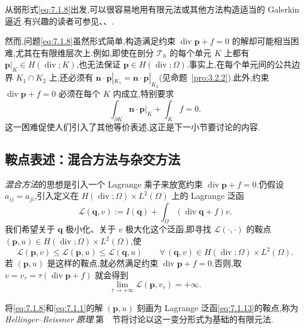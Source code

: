 从弱形式\eqref{eq:7.1.8}出发,可以很容易地用有限元法或其他方法构造适当的 Galerkin 逼近.有兴趣的读者可参见、、.

然而,问题\eqref{eq:7.1.8}虽然形式简单,构造满足约束 \(\operatorname{div}\boldsymbol{p}+f=0\) 的解却可能相当困难,尤其在有限维层次上.例如,即使在剖分 \(\mathcal T_h\) 的每个单元 \(K\) 上都有 \(\boldsymbol{p}|_K\in H(\operatorname{div};K)\),也无法保证 \(\boldsymbol{p}\in H(\operatorname{div};\Omega)\).事实上,在每个单元间的公共边界 \(K_1\cap K_2\) 上,还必须有 \(\boldsymbol{n}\cdot\boldsymbol{p}|_{K_1}=\boldsymbol{n}\cdot\boldsymbol{p}|_{K_2}\)(见命题~\ref{pro:3.2.2}).此外,约束 \(\operatorname{div}\boldsymbol{p}+f=0\) 必须在每个 \(K\) 内成立,特别要求
\[
  \int_{\partial K}\boldsymbol{n}\cdot\boldsymbol{p}|_K+\int_K f=0.
\]
这一困难促使人们引入了其他等价表述,这正是下一小节要讨论的内容.

\subsection{鞍点表述：混合方法与杂交方法}\label{sec:7.1.2}

\emph{混合方法}的思想是引入一个 Lagrange 乘子来放宽约束 \(\operatorname{div}\boldsymbol{p}+f=0\).仍假设 \(a_{ij}=a_{ji}\),引入定义在 \(H(\operatorname{div};\Omega)\times L^2(\Omega)\) 上的 Lagrange 泛函
\begin{equation}\label{eq:7.1.13}
  \mathcal L(\boldsymbol{q},v):=I(\boldsymbol{q})+\int_\Omega(\operatorname{div}\boldsymbol{q}+f)v.
\end{equation}
我们希望关于 \(\boldsymbol{q}\) 极小化、关于 \(v\) 极大化这个泛函,即寻找 \(\mathcal L(\cdot,\cdot)\) 的鞍点 \((\boldsymbol{p},u)\in H(\operatorname{div};\Omega)\times L^2(\Omega)\),使
\begin{equation}\label{eq:7.1.14}
  \mathcal L(\boldsymbol{p},v)\le\mathcal L(\boldsymbol{p},u)\le\mathcal L(\boldsymbol{q},u)
  \qquad\forall\,(\boldsymbol{q},v)\in H(\operatorname{div};\Omega)\times L^2(\Omega).
\end{equation}
若 \((\boldsymbol{p},u)\) 是这样的鞍点,就必然满足约束 \(\operatorname{div}\boldsymbol{p}+f=0\).否则,取 \(v=v_\tau=\tau(\operatorname{div}\boldsymbol{p}+f)\) 就会得到
\[
  \lim_{\tau\to+\infty}\mathcal L(\boldsymbol{p},v_\tau)=+\infty.
\]

将\eqref{eq:7.1.8}和\eqref{eq:7.1.1}的解 \((\boldsymbol{p},u)\) 刻画为 Lagrange 泛函\eqref{eq:7.1.13}的鞍点,称为\emph{Hellinger--Reissner 原理}.第~~节将讨论以这一变分形式为基础的有限元法.

